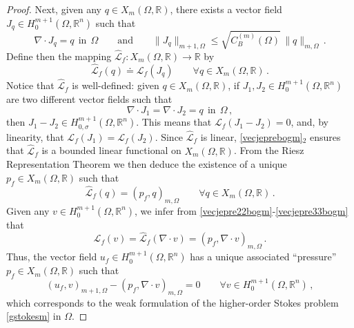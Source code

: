 \documentclass[11pt]{article}
\theoremstyle{plain}
\theoremstyle{definition}
\numberwithin{equation}{section}
\begin{document}
\begin{proof}
	Next, given any $q \in X_{m}(\Omega, \mathbb{R})$, there exists a vector field $J_{q} \in H_{0}^{m+1}(\Omega, \mathbb{R}^{n})$ such that
	\begin{equation} \label{vecjeprebogm}
		\nabla \cdot J_{q} = q \ \ \mbox{in} \ \ \Omega \qquad \text{and} \qquad \| J_{q} \|_{m+1, \Omega} \leq \sqrt{C^{(m)}_{B}(\Omega)} \, \| q\|_{m, \Omega} \, .
	\end{equation}
	Define then the mapping $\widehat{\mathcal{L}}_{f} : X_{m}(\Omega, \mathbb{R}) \longrightarrow \mathbb{R}$ by
	\begin{equation} \label{vecjepre22bogm}
		\widehat{\mathcal{L}}_{f}(q) \doteq \mathcal{L}_{f}(J_{q}) \qquad \forall q \in X_{m}(\Omega, \mathbb{R}) \, .
	\end{equation}
	Notice that $\widehat{\mathcal{L}}_{f}$ is well-defined: given $q \in X_{m}(\Omega, \mathbb{R})$, if $J_{1}, J_{2} \in H_{0}^{m+1}(\Omega, \mathbb{R}^{n})$ are two different vector fields such that
	$$
	\nabla \cdot J_{1} = \nabla \cdot J_{2} = q \ \ \mbox{in} \ \ \Omega \, ,
	$$
	then $J_{1} - J_{2} \in  H^{m+1}_{0, \sigma}(\Omega, \mathbb{R}^{n})$. This means that $\mathcal{L}_{f}(J_{1} - J_{2}) = 0$, and, by linearity, that $\mathcal{L}_{f}(J_{1}) = \mathcal{L}_{f}(J_{2})$. Since $\widehat{\mathcal{L}}_{f}$ is linear, \eqref{vecjeprebogm}$_2$ ensures that $\widehat{\mathcal{L}}_{f}$ is a bounded linear functional on $X_{m}(\Omega, \mathbb{R})$. From the Riesz Representation Theorem we then deduce the existence of a unique $p_{f} \in X_{m}(\Omega, \mathbb{R})$ such that
	\begin{equation} \label{vecjepre33bogm}
		\widehat{\mathcal{L}}_{f}(q) = (p_f,q)_{m, \Omega}  \qquad \forall q \in X_{m}(\Omega, \mathbb{R}) \, .
	\end{equation}
	Given any $v \in H_{0}^{m+1}(\Omega, \mathbb{R}^{n})$, we infer from \eqref{vecjepre22bogm}-\eqref{vecjepre33bogm} that
	$$
	\mathcal{L}_{f}(v) = \widehat{\mathcal{L}}_{f}(\nabla \cdot v) = (p_f,\nabla \cdot v)_{m, \Omega}  \, .
	$$
	Thus, the vector field $u_{f} \in H_{0}^{m+1}(\Omega, \mathbb{R}^{n})$ has a unique associated ``pressure'' $p_{f} \in X_{m}(\Omega, \mathbb{R})$ such that
	\begin{equation} \label{vecjepre34bogm}
		(u_f,v)_{m+1, \Omega} - (p_f,\nabla \cdot v)_{m, \Omega} = 0 \qquad \forall v \in H_{0}^{m+1}(\Omega, \mathbb{R}^{n}) \, ,
	\end{equation}
	which corresponds to the weak formulation of the higher-order Stokes problem \eqref{gstokesm} in $\Omega$.
\end{proof}
\end{document}
